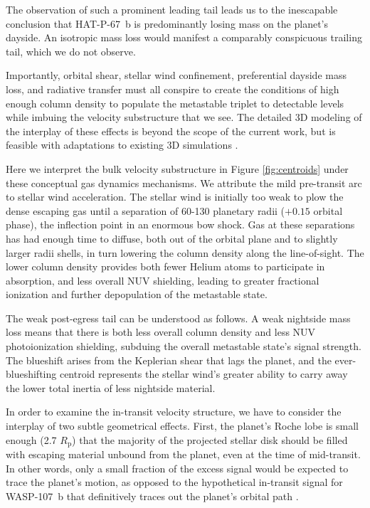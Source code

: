 \documentclass[linenumbers, twocolumn, trackchanges]{aastex631}
\begin{document}
The observation of such a prominent leading tail leads us to the inescapable conclusion that HAT-P-67~b is predominantly losing mass on the planet's dayside.  An isotropic mass loss would manifest a comparably conspicuous trailing tail, which we do not observe.

Importantly, orbital shear, stellar wind confinement, preferential dayside mass loss, and radiative transfer must all conspire to create the conditions of high enough column density to populate the  metastable triplet to detectable levels while imbuing the velocity substructure that we see.  The detailed 3D modeling of the interplay of these effects is beyond the scope of the current work, but is feasible with adaptations to existing 3D simulations \citep{2022ApJ...926..226M}.

Here we interpret the bulk velocity substructure in Figure \ref{fig:centroids} under these conceptual gas dynamics mechanisms.  We attribute the mild pre-transit arc to stellar wind acceleration.  The stellar wind is initially too weak to plow the dense escaping gas until a separation of 60-130 planetary radii ($+0.15$ orbital phase), the inflection point in an enormous bow shock.  Gas at these separations has had enough time to diffuse, both out of the orbital plane and to slightly larger radii shells, in turn lowering the column density along the line-of-sight.  The lower column density provides both fewer Helium atoms to participate in absorption, and less overall NUV shielding, leading to greater fractional ionization and further depopulation of the  metastable state.

The weak post-egress tail can be understood as follows.  A weak nightside mass loss means that there is both less overall column density and less NUV photoionization shielding, subduing the overall  metastable state's signal strength.  The blueshift arises from the Keplerian shear that lags the planet, and the ever-blueshifting centroid represents the stellar wind's greater ability to carry away the lower total inertia of less nightside material.

In order to examine the in-transit velocity structure, we have to consider the interplay of two subtle geometrical effects.  First, the planet's Roche lobe is small enough (2.7 $R_\mathrm{p}$) that the majority of the projected stellar disk should be filled with escaping material unbound from the planet, even at the time of mid-transit.  In other words, only a small fraction of the  excess signal would be expected to trace the planet's motion, as opposed to the hypothetical in-transit signal for WASP-107~b that definitively traces out the planet's orbital path \citep{2022ApJ...926..226M}.
\end{document}

